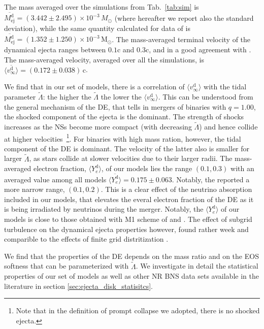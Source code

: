 \documentclass[11pt,a4paper,headinclude=true,DIV=14,BCOR=8mm,chapterprefix,listof=totoc,twoside,openright,abstracton]{scrbook}
\def\Msun{{\text{M}_{\odot}}}
\newcommand{\mr}{mass ratio}
\def\md{M^{\text{d}}_{\text{ej}}}
\def\vd{v^{\text{d}}_\infty}
\def\yd{Y^{\text{d}}_{e}}
\def\amd{\md}
\def\avd{\langle\vd\rangle}
\def\ayd{\langle\yd\rangle}
\begin{document}
The mass averaged over the simulations from Tab.~\ref{tab:sim} is 
$\overline{\amd} = (3.442 \pm 2.495)\times 10^{-3}\,M_{\odot}$ (where
hereafter we report also the standard deviation), while the same
quantity calculated for data of \cite{Radice:2018pdn} 
is $\overline{\md} = (1.352\pm 1.250)\times 10^{-3}\,\Msun$.
The mass-averaged terminal velocity of the dynamical ejecta 
ranges between $0.1$c and $0.3$c, and in a good agreement with 
\cite{Radice:2018pdn}.
The mass-averaged velocity, averaged over all the simulations, is 
$\overline{\avd} = (0.172\pm0.038)\,{\text{c}}$.

We find that in our set of models, there is a correlation of $\avd$ with the tidal parameter 
$\tilde{\Lambda}$: the higher the $\tilde{\Lambda}$ the lower the $\avd$.
This can be understood from the general mechanism of the \ac{DE},
that tells in mergers of binaries with $q=1.00$, the shocked component of the ejecta 
is the dominant. The strength of shocks increases as the \acp{NS} become more compact 
(with decreasing $\tilde{\Lambda}$) and hence collide at higher velocities~\footnote{Note that in the definition of prompt collapse we adopted, there is no shocked ejecta.}.
For binaries with high mass ration, however, the tidal component of the \ac{DE} is dominant. 
The velocity of the latter also is smaller for larger $\tilde{\Lambda}$, as stars collide 
at slower velocities due to their larger radii. 
The mass-averaged electron fraction, $\ayd$, of our models lies the range $(0.1, 0.3)$
with an averaged value among all models $\overline{\ayd} = 0.175 \pm 0.063$.
Notably, the \citet{Radice:2018pdn} reported a more narrow range, $(0.1, 0.2)$.
This is a clear effect of the neutrino absorption included in our models, that elevates 
the everal electron fraction of the \ac{DE} as it is being irradiated by neutrinos 
during the merger.
Notably, the $\ayd$ of our models is close to those obtained with M1 
scheme of \citet{Sekiguchi:2016bjd} and \citet{Vincent:2019kor}.
The effect of subgrid turbulence on the dynamical ejecta properties however,
found rather week and comparible to the effects of finite grid distritization 
\citep{Bernuzzi:2020txg,Radice:2020ids}.

We find that the properties of the \ac{DE} depends on the \mr{} and on the 
\ac{EOS} softness that can be parameterized with $\tilde{\Lambda}$. 
We investigate in detail the statistical properties of our set of models as well as 
other \ac{NR} \ac{BNS} data sets available in the literature in 
section \ref{sec:ejecta_disk_statisitcs}.
\end{document}
